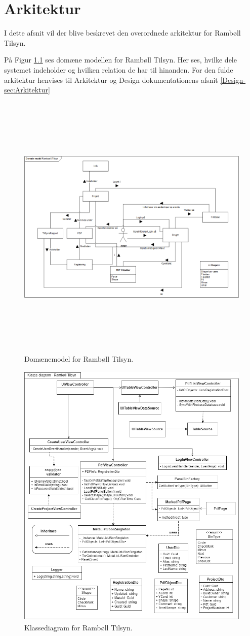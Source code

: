 \chapter{Arkitektur}
I dette afsnit vil der blive beskrevet den overordnede arkitektur for Rambøll Tilsyn.

På Figur \ref{fig:Domain} ses domæne modellen for Rambøll Tilsyn. Her ses, hvilke dele systemet indeholder og hvilken relation de har til hinanden.
For den fulde arkitektur henvises til Arkitektur og Design dokumentationens afsnit \ref{Design-sec:Arkitektur}

\begin{figure}[H] %
	\centering
	\includegraphics[height=13cm, width=17cm]{Arkitektur/Domainmodel}
	\caption{Domænemodel for Rambøll Tilsyn.}
	\label{fig:Domain}
\end{figure}

\clearpage


\begin{figure}[H] %
	\centering
	\includegraphics[height=13cm, width=17cm]{Arkitektur/KlasseDiagram}
	\caption{Klassediagram for Rambøll Tilsyn.}
	\label{fig:KlasseDiagram}
\end{figure}

